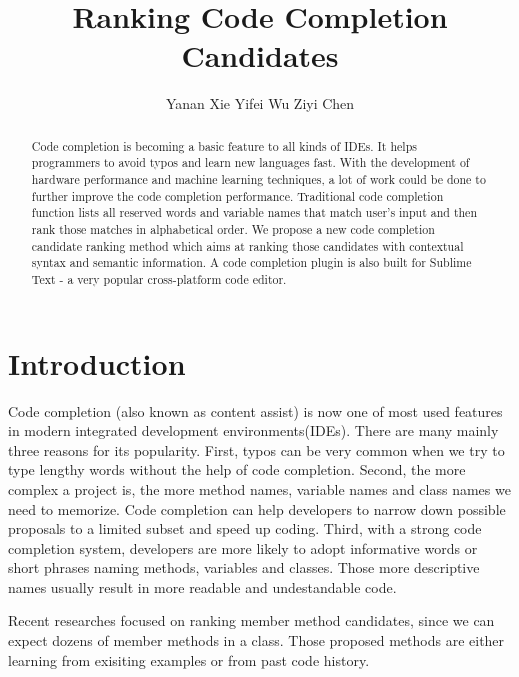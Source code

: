 \documentclass[prodmode,acmtecs]{acmsmall} %
\begin{document}

\title{Ranking Code Completion Candidates}
\author{Yanan Xie
Yifei Wu
Ziyi Chen
}
\begin{abstract}
Code completion is becoming a basic feature to all kinds of IDEs. It helps programmers to avoid typos and learn new languages fast. With the development of hardware performance and machine learning techniques, a lot of work could be done to further improve the code completion performance. Traditional code completion function lists all reserved words and variable names that match user’s input and then rank those matches in alphabetical order. We propose a new code completion candidate ranking method which aims at ranking those candidates with contextual syntax and semantic information. A code completion plugin is also built for Sublime Text - a very popular cross-platform code editor.
\end{abstract}


\maketitle


\section{Introduction}

Code completion (also known as content assist) is now one of most used features in modern integrated development environments(IDEs)\cite{murphy2006java}. There are many mainly three reasons for its popularity. First, typos can be very common when we try to type lengthy words without the help of code completion. Second, the more complex a project is, the more method names, variable names and class names we need to memorize. Code completion can help developers to narrow down possible proposals to a limited subset and speed up coding. Third, with a strong code completion system, developers are more likely to adopt informative words or short phrases naming methods, variables and classes. Those more descriptive names usually result in more readable and undestandable code\cite{bruch2009learning}. 

Recent researches focused on ranking member method candidates, since we can expect dozens of member methods in a class. Those proposed methods are either learning from exisiting examples\cite{bruch2009learning,raychev2014code} or from past code history\cite{robbes2008program}. 
\end{document}
